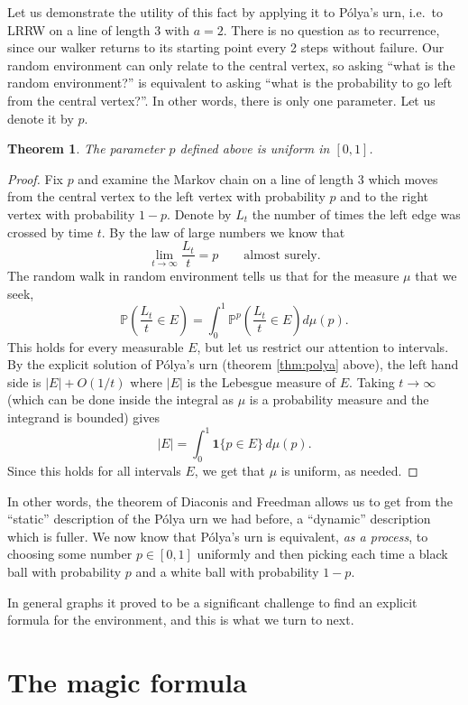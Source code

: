 \documentclass{emsprocart}
\theoremstyle{plain}
\newtheorem{thm}{Theorem}
\begin{document}
Let us demonstrate the utility of this fact by applying it to P\'olya's
urn, i.e.\ to LRRW on a line of length $3$ with $a=2$. There is
no question as to recurrence, since our walker returns to its starting
point every 2 steps without failure. Our random environment can only
relate to the central vertex, so asking ``what is the random environment?''
is equivalent to asking ``what is the probability to go left from
the central vertex?''. In other words, there is only one parameter.
Let us denote it by $p$.
\begin{thm}
\label{thm:polyaunif}The parameter $p$ defined above is uniform
in $[0,1]$.\end{thm}
\begin{proof}
Fix $p$ and examine the Markov chain on a line of length $3$ which
moves from the central vertex to the left vertex with probability
$p$ and to the right vertex with probability $1-p$. Denote by $L_{t}$
the number of times the left edge was crossed by time $t$. By the
law of large numbers we know that 
\[
\lim_{t\to\infty}\frac{L_{t}}{t}=p\qquad\mbox{almost surely.}
\]
The random walk in random environment tells us that for the measure
$\mu$ that we seek,
\[
\mathbb{P}\left(\frac{L_{t}}{t}\in E\right)=\int_{0}^{1}\mathbb{P}^{p}\left(\frac{L_{t}}{t}\in E\right)d\mu(p).
\]
This holds for every measurable $E$, but let us restrict our attention
to intervals. By the explicit solution of P\'olya's urn (theorem
\ref{thm:polya} above), the left hand side is $|E|+O(1/t)$ where
$|E|$ is the Lebesgue measure of $E$. Taking $t\to\infty$ (which
can be done inside the integral as $\mu$ is a probability measure
and the integrand is bounded) gives
\[
|E|=\int_{0}^{1}\mathbf{1}\{p\in E\}\, d\mu(p).
\]
Since this holds for all intervals $E$, we get that $\mu$ is uniform,
as needed.
\end{proof}
In other words, the theorem of Diaconis and Freedman allows us to
get from the ``static'' description of the P\'olya urn we had before,
a ``dynamic'' description which is fuller. We now know that P\'olya's
urn is equivalent, \emph{as a process}, to choosing some number $p\in[0,1]$
uniformly and then picking each time a black ball with probability
$p$ and a white ball with probability $1-p$.

In general graphs it proved to be a significant challenge to find
an explicit formula for the environment, and this is what we turn
to next.

\section{The magic formula}
\end{document}
